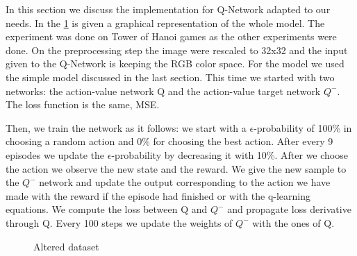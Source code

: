 In this section we discuss the implementation for Q-Network adapted to our needs. In the \ref{fig:qmodel} is given a graphical representation of the whole model. The experiment was done on Tower of Hanoi games as the other experiments were done. On the preprocessing step the image were rescaled to 32x32 and the input given to the Q-Network is keeping the RGB color space. For the model we used the simple model discussed in the last section. This time we started with two networks: the action-value network Q and the action-value target network $Q^-$. The loss function is the same, MSE.

Then, we train the network as it follows: we start with a $\epsilon$-probability of 100\% in choosing a random action and 0\% for choosing the best action. After every 9 episodes we update the $\epsilon$-probability by decreasing it with 10\%. After we choose the action we observe the new state and the reward. We give the new sample to the $Q^-$ network and update the output corresponding to the action we have made with the reward if the episode had finished or with the q-learning equations. We compute the loss between Q and $Q^-$ and propagate loss derivative through Q. Every 100 steps we update the weights of $Q^-$ with the ones of Q.


\begin{figure}[h]
	\begin{center}
		\caption{Altered dataset} \label{fig:qmodel}
    \end{center}
\end{figure}

